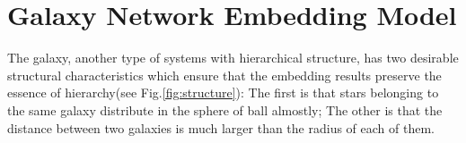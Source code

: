 \documentclass{article}
\theoremstyle{definition}
\newtheorem{defn}{Definition}
\begin{document}
 
	\section{Galaxy Network Embedding Model}
	\label{sec:model}
	 
	 The galaxy, another type of systems with hierarchical structure, has two desirable structural characteristics which ensure that the embedding results preserve the essence of hierarchy(see Fig.\ref{fig:structure}): The first is that stars belonging to the same galaxy distribute in the sphere of ball almostly; The other is that the distance between two galaxies is much larger than the radius of each of them.
	 
\end{document}
